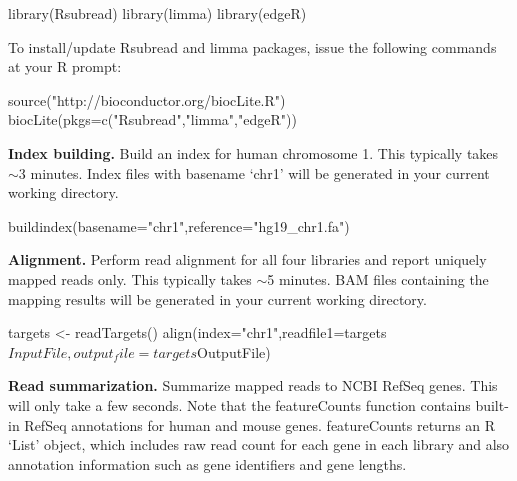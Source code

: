 \documentclass[12pt]{report}
\newcommand{\Rsubread}{\textsf{Rsubread}}
\newcommand{\limma}{\textsf{limma}}
\newcommand{\featureCounts}{\textsf{featureCounts}}
\newcommand{\R}{\textsf{R}}
\begin{document}
\begin{Rcode}
library(Rsubread)
library(limma)
library(edgeR)
\end{Rcode}

To install/update {\Rsubread} and {\limma} packages, issue the following commands at your R prompt:
\begin{Rcode}
source("http://bioconductor.org/biocLite.R")
biocLite(pkgs=c("Rsubread","limma","edgeR"))
\end{Rcode}

{\noindent\bf Index building.} Build an index for human chromosome 1. This typically takes $\sim$3 minutes. Index files with basename `chr1' will be generated in your current working directory.

\begin{Rcode}
buildindex(basename="chr1",reference="hg19_chr1.fa")
\end{Rcode}

{\noindent\bf Alignment.} Perform read alignment for all four libraries and report uniquely mapped reads only. This typically takes $\sim$5 minutes. BAM files containing the mapping results will be generated in your current working directory.

\begin{Rcode}
targets <- readTargets()
align(index="chr1",readfile1=targets$InputFile,output_file=targets$OutputFile)
\end{Rcode}

{\noindent\bf Read summarization.} Summarize mapped reads to NCBI RefSeq genes.
This will only take a few seconds.
Note that the {\featureCounts} function contains built-in RefSeq annotations for human and mouse genes.
{\featureCounts} returns an {\R} `List' object, which includes raw read count for each gene in each library and also annotation information such as gene identifiers and gene lengths.

\end{document}
